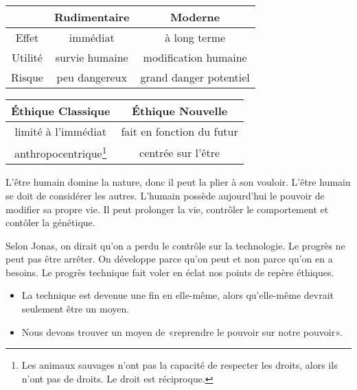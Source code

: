\documentclass[11pt]{article}
\begin{document}

\begin{center}
\begin{tabular}{@{}ccc@{}}
\hline
& \textbf{Rudimentaire}
& \textbf{Moderne}\\
\hline
  Effet
& immédiat
& à long terme\\
  Utilité
& survie humaine
& modification humaine\\
  Risque
& peu dangereux
& grand danger potentiel\\
\hline
\end{tabular}
\end{center}

\begin{center}
\begin{tabular}{@{}cc@{}}
\hline
  \textbf{Éthique Classique}
& \textbf{Éthique Nouvelle}\\
\hline
  limité à l'immédiat
& fait en fonction du futur\\
  anthropocentrique\footnote{Les animaux sauvages n'ont pas la capacité de respecter les droits, alors ils n'ont pas de droits. Le droit est réciproque.}
& centrée sur l'être\\
\hline
\end{tabular}
\end{center}

L'être humain domine la nature, donc il peut la plier à son vouloir. L'être humain se doit de considérer les autres. L'humain possède aujourd'hui le pouvoir de modifier sa propre vie. Il peut prolonger la vie, contrôler le comportement et contôler la génétique.


Selon Jonas, on dirait qu'on a perdu le contrôle sur la technologie. Le progrès ne peut pas être arrêter. On développe parce qu'on peut et non parce qu'on en a besoins. Le progrès technique fait voler en éclat nos points de repère éthiques.
\begin{itemize}  
\item La technique est devenue une fin en elle-même, alors qu'elle-même devrait seulement être un moyen.
\item Nous devons trouver un moyen de «reprendre le pouvoir sur notre pouvoir».
\end{itemize}
\end{document}
